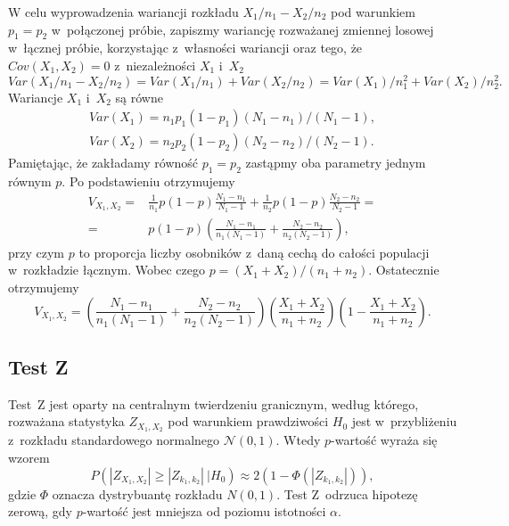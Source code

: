 W celu wyprowadzenia wariancji rozkładu $X_1/n_1-X_2/n_2$ pod warunkiem $p_1=p_2$ w~połączonej próbie, zapiszmy wariancję rozważanej zmiennej losowej w~łącznej próbie, korzystając z~własności wariancji oraz tego, że $Cov(X_1,X_2)=0$ z~niezależności $X_1$ i~$X_2$
\begin{equation}
Var(X_1/n_1-X_2/n_2)=Var(X_1/n_1) + Var(X_2/n_2) = Var(X_1)/n_1^2+Var(X_2)/n_2^2.
\end{equation}
Wariancje $X_1$ i~$X_2$ są równe
\begin{align}
Var(X_1)=n_1 p_1 (1-p_1)(N_1-n_1)/(N_1-1),\\
Var(X_2)=n_2 p_2 (1-p_2)(N_2-n_2)/(N_2-1).
\end{align}
Pamiętając, że zakładamy równość $p_1=p_2$ zastąpmy oba parametry jednym równym $p$. Po podstawieniu otrzymujemy
\begin{equation}
\begin{split}
V_{X_1,X_2} =& \frac{1}{n_1}p(1-p)\frac{N_1-n_1}{N_1-1} + \frac{1}{n_2}p(1-p)\frac{N_2-n_2}{N_2-1}= \\
=&p(1-p)\left(\frac{N_1-n_1}{n_1(N_1-1)}+\frac{N_2-n_2}{n_2(N_2-1)}\right),
\end{split}
\end{equation}
przy czym $p$ to proporcja liczby osobników z~daną cechą do całości populacji w~rozkładzie łącznym. Wobec czego $p=(X_1+X_2)/(n_1+n_2)$. Ostatecznie otrzymujemy
\begin{equation}
V_{X_1,X_2} = \left(\frac{N_1-n_1}{n_1(N_1-1)}+\frac{N_2-n_2}{n_2(N_2-1)}\right)\left(\frac{X_1+X_2}{n_1+n_2}\right)\left(1-\frac{X_1+X_2}{n_1+n_2}\right).
\end{equation}

\subsection{Test Z}
Test~Z jest oparty na centralnym twierdzeniu granicznym, według którego, rozważana statystyka $Z_{X_1,X_2}$ pod warunkiem prawdziwości $H_0$ jest w~przybliżeniu z~rozkładu standardowego normalnego $\mathcal{N}(0,1)$. Wtedy $p$-wartość wyraża się wzorem
\begin{equation}
P(|Z_{X_1,X_2}|\geq|Z_{k_1,k_2}|\ |H_0) \approx 2(1-\Phi(|Z_{k_1,k_2}|)),
\end{equation}
gdzie $\Phi$ oznacza dystrybuantę rozkładu $N(0,1)$. Test Z~odrzuca hipotezę zerową, gdy $p$-wartość jest mniejsza od poziomu istotności $\alpha$.

